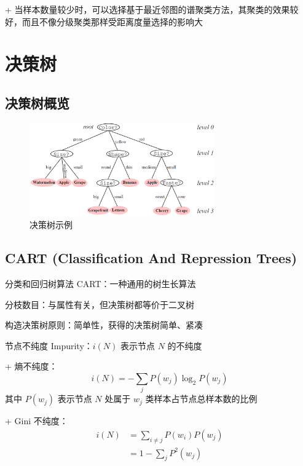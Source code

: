 \documentclass[openany,a4paper,12pt]{ctexbook}
\theoremstyle{kaiti}
\theoremstyle{normal}
\begin{document}
+ 当样本数量较少时，可以选择基于最近邻图的谱聚类方法，其聚类的效果较好，而且不像分级聚类那样受距离度量选择的影响大

\chapter{决策树}

\section{决策树概览}

\begin{figure}
  \centering
  \includegraphics[width=8cm]{1627808711971-11.1.png}
  \caption{决策树示例}
\end{figure}

\section{CART (Classification And Repression Trees)}

分类和回归树算法 CART：一种通用的树生长算法

分枝数目：与属性有关，但决策树都等价于二叉树

构造决策树原则：简单性，获得的决策树简单、紧凑

节点不纯度 Impurity：$i\left(N \right)$ 表示节点 $N$ 的不纯度

+ 熵不纯度：
  \begin{equation}
  i\left(N \right)=-\sum_jP\left(w_j \right)\log_2P\left(w_j \right)
  \end{equation}
  其中 $P\left(w_j \right)$ 表示节点 $N$ 处属于 $w_j$ 类样本占节点总样本数的比例

+ Gini 不纯度：
  \begin{equation}
  \begin{aligned}
    i\left(N \right)
    &=\sum_{i\ne j}P\left(w_i \right)P\left(w_j \right)\\
    &=1-\sum_jP^2\left(w_j \right)
  \end{aligned}
  \end{equation}
\end{document}
